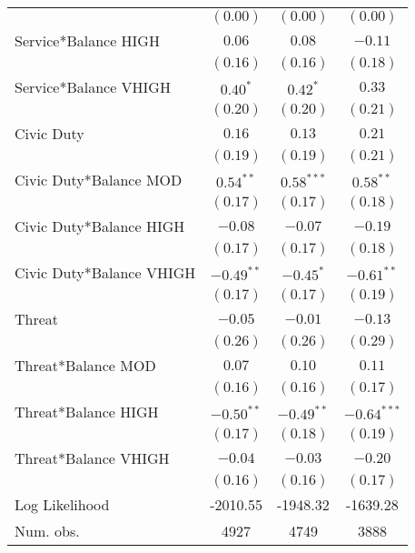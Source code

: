 \documentclass[12pt,titlepage]{article}
\begin{document}
\begin{center}
\begin{longtable}{| l | c |  c| c|}
                  & $(0.00)$      & $(0.00)$      & $(0.00)$      \\
Service*Balance HIGH  & $0.06$        & $0.08$        & $-0.11$       \\
                  & $(0.16)$      & $(0.16)$      & $(0.18)$      \\
Service*Balance VHIGH  & $0.40^{*}$    & $0.42^{*}$    & $0.33$        \\
                  & $(0.20)$      & $(0.20)$      & $(0.21)$      \\
Civic Duty              & $0.16$        & $0.13$        & $0.21$        \\
                  & $(0.19)$      & $(0.19)$      & $(0.21)$      \\
Civic Duty*Balance MOD   & $0.54^{**}$   & $0.58^{***}$  & $0.58^{**}$   \\
                  & $(0.17)$      & $(0.17)$      & $(0.18)$      \\
Civic Duty*Balance HIGH   & $-0.08$       & $-0.07$       & $-0.19$       \\
                  & $(0.17)$      & $(0.17)$      & $(0.18)$      \\
Civic Duty*Balance VHIGH   & $-0.49^{**}$  & $-0.45^{*}$   & $-0.61^{**}$  \\
                  & $(0.17)$      & $(0.17)$      & $(0.19)$      \\
Threat            & $-0.05$       & $-0.01$       & $-0.13$       \\
                  & $(0.26)$      & $(0.26)$      & $(0.29)$      \\
Threat*Balance MOD & $0.07$        & $0.10$        & $0.11$        \\
                  & $(0.16)$      & $(0.16)$      & $(0.17)$      \\
Threat*Balance HIGH & $-0.50^{**}$  & $-0.49^{**}$  & $-0.64^{***}$ \\
                  & $(0.17)$      & $(0.18)$      & $(0.19)$      \\
Threat*Balance VHIGH & $-0.04$       & $-0.03$       & $-0.20$       \\
                  & $(0.16)$      & $(0.16)$      & $(0.17)$      \\
\hline
Log Likelihood    & -2010.55      & -1948.32      & -1639.28      \\
Num. obs.         & 4927          & 4749          & 3888          \\
\end{longtable}
\end{center}
\end{document}
